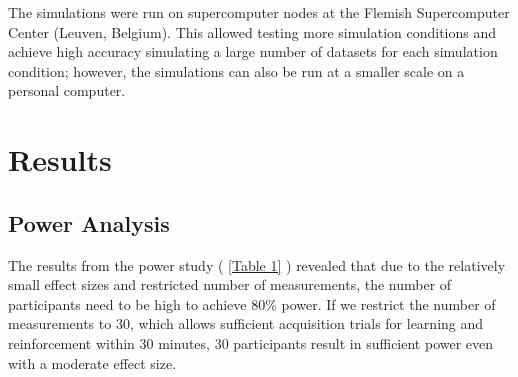 \documentclass{article}
\begin{document}
The simulations were run on supercomputer nodes at the Flemish Supercomputer Center (Leuven, Belgium). This allowed testing more simulation conditions and achieve high accuracy simulating a large number of datasets for each simulation condition; however, the simulations can also be run at a smaller scale on a personal computer. 

\section{Results} 

\subsection{Power Analysis} 

The results from the power study ( \ref{Table 1} ) revealed that due to the relatively small effect sizes and restricted number of measurements, the number of participants need to be high to achieve 80\% power. If we restrict the number of measurements to 30, which allows sufficient acquisition trials for learning and reinforcement within 30 minutes, 30 participants result in sufficient power even with a moderate effect size. 
\end{document}
